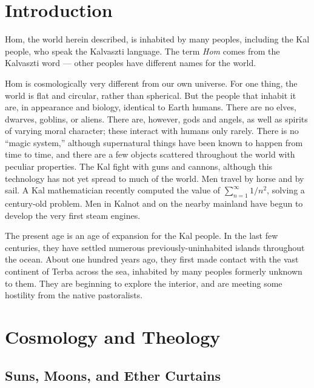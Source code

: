 \documentclass{article}
\title{\thetitle}
\author{\theauthor}
\begin{document}
\maketitle

\section{Introduction}

Hom, the world herein described, is inhabited by many peoples, including the Kal people, who speak the Kalvaszti language. The term \textit{Hom} comes from the Kalvaszti word  --- other peoples have different names for the world.

Hom is cosmologically very different from our own universe. For one thing, the world is flat and circular, rather than spherical. But the people that inhabit it are, in appearance and biology, identical to Earth humans. There are no elves, dwarves, goblins, or aliens. There are, however, gods and angels, as well as spirits of varying moral character; these interact with humans only rarely. There is no ``magic system,'' although supernatural things have been known to happen from time to time, and there are a few objects scattered throughout the world with peculiar properties. The Kal fight with guns and cannons, although this technology has not yet spread to much of the world. Men travel by horse and by sail. A Kal mathematician recently computed the value of $\sum_{n = 1}^\infty 1/n^2$, solving a century-old problem. Men in Kalnot and on the nearby mainland have begun to develop the very first steam engines.

The present age is an age of expansion for the Kal people. In the last few centuries, they have settled numerous previously-uninhabited islands throughout the ocean. About one hundred years ago, they first made contact with the vast continent of Terba across the sea, inhabited by many peoples formerly unknown to them. They are beginning to explore the interior, and are meeting some hostility from the native pastoralists.  

\section{Cosmology and Theology}

\subsection{Suns, Moons, and Ether Curtains}
\end{document}
